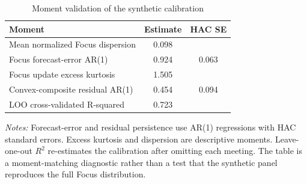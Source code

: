 \begin{table}[htbp]
\color{revisionred}
\centering
\begin{threeparttable}
\caption{Moment validation of the synthetic calibration}
\label{tab:moment-battery}
\begin{footnotesize}
\begin{tabular}{lcc}
\toprule
Moment & Estimate & HAC SE \\
\midrule
Mean normalized Focus dispersion & 0.098 &  \\
Focus forecast-error AR(1) & 0.924 & 0.063 \\
Focus update excess kurtosis & 1.505 &  \\
Convex-composite residual AR(1) & 0.454 & 0.094 \\
LOO cross-validated R-squared & 0.723 &  \\
\bottomrule
\end{tabular}
\begin{tablenotes}[flushleft]
\scriptsize
\item \textit{Notes:} Forecast-error and residual persistence use AR(1) regressions with HAC standard errors. Excess kurtosis and dispersion are descriptive moments. Leave-one-out $R^2$ re-estimates the calibration after omitting each meeting. The table is a moment-matching diagnostic rather than a test that the synthetic panel reproduces the full Focus distribution.
\end{tablenotes}
\end{footnotesize}
\end{threeparttable}
\end{table}
